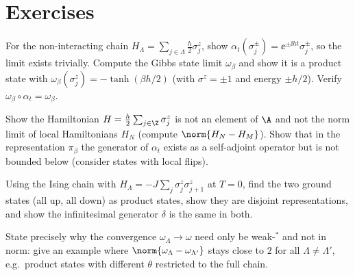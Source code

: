 \section*{Exercises}
\begin{exercise}
For the non-interacting chain $H_\Lambda=\sum_{j\in\Lambda}\frac h2\sigma^z_j$, show $\alpha_t(\sigma^\pm_j)=\ee^{\pm\ii ht}\sigma^\pm_j$, so the limit exists trivially. Compute the Gibbs state limit $\omega_\beta$ and show it is a product state with $\omega_\beta(\sigma^z_j)=-\tanh(\beta h/2)$ (with $\sigma^z=\pm1$ and energy $\pm h/2$). Verify $\omega_\beta\circ\alpha_t=\omega_\beta$.
\end{exercise}
\begin{exercise}
Show the Hamiltonian $H=\frac h2\sum_{j\in\Z}\sigma_j^z$ is not an element of $\A$ and not the norm limit of local Hamiltonians $H_N$ (compute $\norm{H_N-H_M}$). Show that in the representation $\pi_\beta$ the generator of $\alpha_t$ exists as a self-adjoint operator but is not bounded below (consider states with local flips).
\end{exercise}
\begin{exercise}
Using the Ising chain with $H_\Lambda=-J\sum_j\sigma_j^z\sigma_{j+1}^z$ at $T=0$, find the two ground states (all up, all down) as product states, show they are disjoint representations, and show the infinitesimal generator $\delta$ is the same in both.
\end{exercise}
\begin{exercise}
State precisely why the convergence $\omega_\Lambda\to\omega$ need only be weak-$^*$ and not in norm: give an example where $\norm{\omega_\Lambda-\omega_{\Lambda'}}$ stays close to $2$ for all $\Lambda\neq\Lambda'$, e.g.\ product states with different $\theta$ restricted to the full chain.
\end{exercise}
